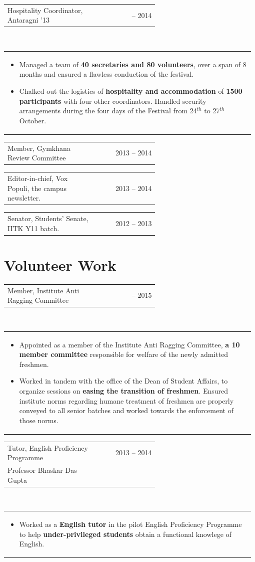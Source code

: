 \documentclass[a4paper]{article} %
\newcommand{\verticalspacing}{-0.25cm}
\newcommand{\headspace}{-0.3cm}
\newcommand{\bulletspace}{0.7cm}
\newcommand{\projectheadspacing}{6.9cm}
\newcommand{\cproject}[5]{%
    \begin{tabular}{p{0.60\linewidth}r}
        \textcolor{NavyBlue}{\small #2} & \multicolumn{1}{m{ \projectheadspacing{} }}{\raggedleft \small {\textsc{#1}}}\\
        \small {#3} & \small {#4}
    \end{tabular}\\
    \begin{tabular}{p{0.98\linewidth}}
    \vspace{-0.3cm}
        \small{#5}
    \end{tabular}
    \vspace{\verticalspacing{}}
}
\newcommand{\gitproject}[3]{%
    \begin{tabular}{p{0.60\linewidth}r}
        \textcolor{NavyBlue}{\small #2} & \multicolumn{1}{m{ \projectheadspacing{} }}{\raggedleft #1}\\
    \end{tabular}\\
    \begin{tabular}{p{0.98\linewidth}}
        \vspace{\headspace{}}
        \small{#3}
    \end{tabular}
    \vspace{\verticalspacing{}}
    \vspace{-0.2cm} %
}
\newcommand{\skill}[2]{%
    \begin{tabular}{p{0.60\linewidth}r}
        \small {#2} & \multicolumn{1}{m{ \projectheadspacing{} }}{\raggedleft \textsc{\small #1}}\\
    \end{tabular}
    \vspace{\verticalspacing{}}
}
\begin{document}
\gitproject
    {2013 -- 2014}
    {Hospitality Coordinator, Antaragni '13}
    {%
        \begin{itemize}[leftmargin=\bulletspace{}]
            \item Managed a team of \textbf{40 secretaries and 80 volunteers}, over a span of 8 months and ensured a
                flawless conduction of the festival.
            \item Chalked out the logistics of \textbf{hospitality and accommodation} of \textbf{1500 participants}
                with four other coordinators.  Handled security arrangements during the four days of the
                Festival from 24$^{th}$ to 27$^{th}$ October.
        \end{itemize}
    }

\skill
    {2013 -- 2014}
    {Member, Gymkhana Review Committee}

\skill
    {2013 -- 2014}
    {Editor-in-chief, Vox Populi, the campus newsletter.}

\skill
    {2012 -- 2013}
    {Senator, Students' Senate, IITK Y11 batch.}


\section{Volunteer Work}

\gitproject
    {2014 -- 2015}
    {Member, Institute Anti Ragging Committee}
    {%
        \begin{itemize}[leftmargin=\bulletspace{}]
            \item Appointed as a member of the Institute Anti Ragging Committee, \textbf{a 10 member committee} responsible
                for welfare of the newly admitted freshmen.
            \item Worked in tandem with the office of the Dean of Student Affairs, to organize sessions
                on \textbf{easing the transition of freshmen}.  Ensured institute norms regarding humane treatment
                of freshmen are properly conveyed to all senior batches and worked towards the enforcement of those norms.
        \end{itemize}
    }

\cproject
    {2013 -- 2014}
    {Tutor, English Proficiency Programme}
    {Professor Bhaskar Das Gupta}
    {}
    {%
        \begin{itemize}[leftmargin=\bulletspace{}]
            \item Worked as a \textbf{English tutor} in the pilot English Proficiency Programme to help
                \textbf{under-privileged students} obtain a functional knowlege of English.
        \end{itemize}
    }
\end{document}
